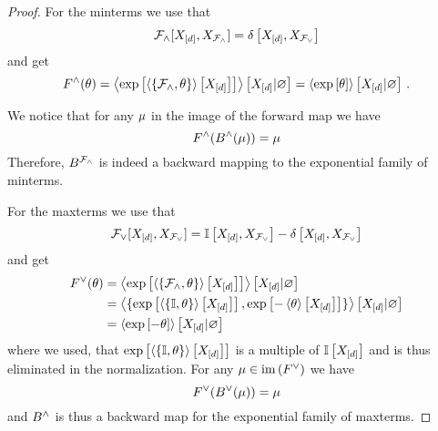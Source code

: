 \begin{proof}
    For the minterms we use that
    \[ \mathcal{F}_{\land}[X_{[d]},X_{\mathcal{F}_{\land}}]  = \delta\left[X_{[d]},X_{\mathcal{F}_{\lor}}\right]\]
    and get
    \[ F^{\land}(\theta)
    = \left\langle 
        \mathrm{exp}\left[\left\langle \{\mathcal{F}_{\land}, \theta\}\right\rangle \left[ X_{[d]} \right]\right]
    \right\rangle \left[ X_{[d]} | \varnothing \right]
    =
    \left\langle \mathrm{exp}\left[\theta\right]\right\rangle \left[ X_{[d]} | \varnothing \right] \, .
    \]

    We notice that for any $\mu$ in the image of the forward map we have
    \[ F^{\land}(B^{\land}(\mu)) = \mu \]
    Therefore, $B^{\mathcal{F}_{\land}}$ is indeed a backward mapping to the exponential family of minterms.

    For the maxterms we use that
    \[ \mathcal{F}_{\lor}[X_{[d]},X_{\mathcal{F}_{\lor}}] = \mathbb{I}\left[X_{[d]},X_{\mathcal{F}_{\lor}}\right]-\delta\left[X_{[d]},X_{\mathcal{F}_{\lor}}\right] \]
    and get
    \begin{align*}
        F^{\lor}(\theta)
        & = \left\langle 
            \mathrm{exp}\left[\left\langle \{\mathcal{F}_{\land}, \theta\}\right\rangle \left[ X_{[d]} \right]\right]
        \right\rangle \left[ X_{[d]} | \varnothing \right] \\
        & = \left\langle \{
        \mathrm{exp}\left[\left\langle \{\mathbb{I}, \theta\}\right\rangle \left[ X_{[d]} \right]\right],
            \mathrm{exp}\left[-\left\langle \theta\right\rangle \left[ X_{[d]} \right]\right] \}
        \right\rangle \left[ X_{[d]} | \varnothing \right] \\
        & = \left\langle 
            \mathrm{exp}\left[-\theta\right]
        \right\rangle \left[ X_{[d]} | \varnothing \right]
    \end{align*}
    where we used, that $\mathrm{exp}\left[\left\langle \{\mathbb{I}, \theta\}\right\rangle \left[ X_{[d]} \right]\right]$ is a multiple of $\mathbb{I}\left[X_{[d]}\right]$ and is thus eliminated in the normalization.
    For any $\mu\in\mathrm{im}\left(F^{\lor}\right)$ we have
    \[ F^{\lor}(B^{\lor}(\mu) )
    = \mu
    \]
    and $B^{\land}$ is thus a backward map for the exponential family of maxterms.
\end{proof}

